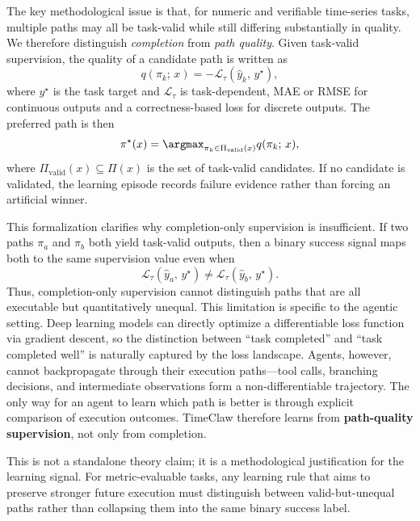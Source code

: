 The key methodological issue is that, for numeric and verifiable time-series tasks, multiple paths may all be task-valid while still differing substantially in quality. We therefore distinguish \emph{completion} from \emph{path quality}. Given task-valid supervision, the quality of a candidate path is written as
\begin{equation}
q(\pi_k;\, x) = -\mathcal{L}_{\tau}(\hat{y}_k,\, y^\star),
\end{equation}
where $y^\star$ is the task target and $\mathcal{L}_{\tau}$ is task-dependent, \eg MAE or RMSE for continuous outputs and a correctness-based loss for discrete outputs. The preferred path is then
\begin{equation}
\pi^\star(x) = \argmax_{\pi_k \in \Pi_{\mathrm{valid}}(x)} q(\pi_k;\, x),
\end{equation}
where $\Pi_{\mathrm{valid}}(x)\subseteq \Pi(x)$ is the set of task-valid candidates. If no candidate is validated, the learning episode records failure evidence rather than forcing an artificial winner.

This formalization clarifies why completion-only supervision is insufficient. If two paths $\pi_a$ and $\pi_b$ both yield task-valid outputs, then a binary success signal maps both to the same supervision value even when
\begin{equation}
\mathcal{L}_{\tau}(\hat{y}_a,\, y^\star) \neq \mathcal{L}_{\tau}(\hat{y}_b,\, y^\star).
\end{equation}
Thus, completion-only supervision cannot distinguish paths that are all executable but quantitatively unequal. This limitation is specific to the agentic setting. Deep learning models can directly optimize a differentiable loss function via gradient descent, so the distinction between ``task completed'' and ``task completed well'' is naturally captured by the loss landscape. Agents, however, cannot backpropagate through their execution paths---tool calls, branching decisions, and intermediate observations form a non-differentiable trajectory. The only way for an agent to learn which path is better is through explicit comparison of execution outcomes. TimeClaw therefore learns from \textbf{path-quality supervision}, not only from completion.

This is not a standalone theory claim; it is a methodological justification for the learning signal. For metric-evaluable tasks, any learning rule that aims to preserve stronger future execution must distinguish between valid-but-unequal paths rather than collapsing them into the same binary success label.

